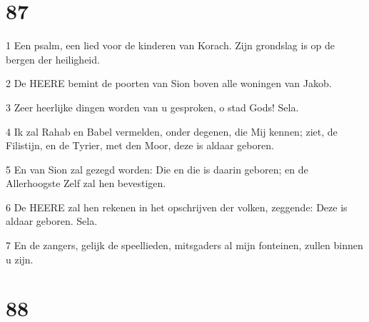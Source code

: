 \chapter{87}

\par 1 Een psalm, een lied voor de kinderen van Korach. Zijn grondslag is op de bergen der heiligheid.
\par 2 De HEERE bemint de poorten van Sion boven alle woningen van Jakob.
\par 3 Zeer heerlijke dingen worden van u gesproken, o stad Gods! Sela.
\par 4 Ik zal Rahab en Babel vermelden, onder degenen, die Mij kennen; ziet, de Filistijn, en de Tyrier, met den Moor, deze is aldaar geboren.
\par 5 En van Sion zal gezegd worden: Die en die is daarin geboren; en de Allerhoogste Zelf zal hen bevestigen.
\par 6 De HEERE zal hen rekenen in het opschrijven der volken, zeggende: Deze is aldaar geboren. Sela.
\par 7 En de zangers, gelijk de speellieden, mitsgaders al mijn fonteinen, zullen binnen u zijn.

\chapter{88}

